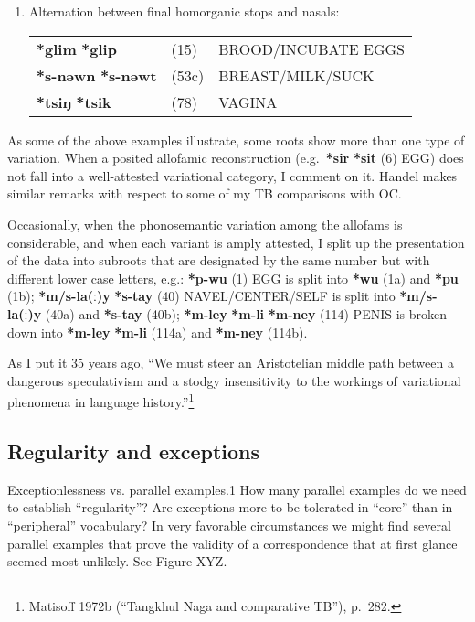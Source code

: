 \begin{enumerate}
\item %
Alternation between final homorganic stops and nasals:\nopagebreak[4]

\begin{tabular}{lll}
\textbf{*glim} \STEDTU{⪤} \textbf{*glip} 	&(15)	&BROOD/INCUBATE EGGS\\
\textbf{*s-nəwn} \STEDTU{⪤} \textbf{*s-nəwt} &(53c)	&BREAST/MILK/SUCK\\
\textbf{*tsiŋ} \STEDTU{⪤} \textbf{*tsik} &(78)	 	&VAGINA\\
\end{tabular}
\end{enumerate}


As some of the above examples illustrate, some roots show more than one type
of variation.  When a posited allofamic reconstruction (e.g.\ \textbf{*sir}  \textbf{*sit} (6)
EGG) does not fall into a well-attested variational category, I comment on it. 
Handel makes similar remarks with respect to some of my TB comparisons with OC.


Occasionally, when the phonosemantic variation among the allofams is
considerable, and when each variant is amply attested, I split up the
presentation of the data into subroots that are designated by the same number
but with different lower case letters, e.g.: \textbf{*p-wu} (1) EGG is split into \textbf{*wu}
(1a) and \textbf{*pu} (1b);
\textbf{*m/s-la(ː)y}  \textbf{*s-tay} (40) NAVEL/CENTER/SELF is split into
\textbf{*m/s-la(ː)y} (40a) and \textbf{*s-tay} (40b);
\textbf{*m-ley}  \textbf{*m-li}  \textbf{*m-ney} (114) PENIS is
broken down into \textbf{*m-ley}  \textbf{*m-li} (114a)
and \textbf{*m-ney} (114b).


As I put it 35 years ago, “We must steer an Aristotelian middle path between
a dangerous speculativism and a stodgy insensitivity to the workings of
variational phenomena in language history.”\footnote{Matisoff 1972b (“Tangkhul
Naga and comparative TB”), p.~282.}

\subsection{Regularity and exceptions}

Exceptionlessness vs. parallel examples.1  How many parallel examples do we need to establish “regularity”?  Are exceptions more to be tolerated in “core” than in “peripheral” vocabulary? In very favorable circumstances we might find several parallel examples that prove the validity of a correspondence that at first glance seemed most unlikely. See Figure XYZ.

